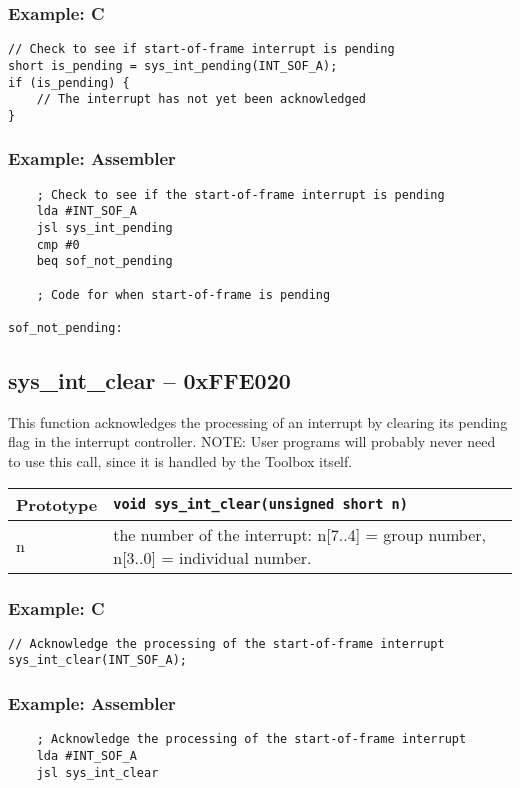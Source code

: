 \subsubsection*{Example: C}
\begin{lstlisting}
// Check to see if start-of-frame interrupt is pending
short is_pending = sys_int_pending(INT_SOF_A);
if (is_pending) {
	// The interrupt has not yet been acknowledged
}
\end{lstlisting}

\subsubsection*{Example: Assembler}
\begin{verbatim}
    ; Check to see if the start-of-frame interrupt is pending
    lda #INT_SOF_A
    jsl sys_int_pending
    cmp #0
    beq sof_not_pending

    ; Code for when start-of-frame is pending

sof_not_pending:
\end{verbatim}

\subsection*{sys\_int\_clear -- 0xFFE020}
This function acknowledges the processing of an interrupt by clearing its pending flag in the interrupt controller.
NOTE: User programs will probably never need to use this call, since it is handled by the Toolbox itself.

\bigskip

\begin{tabular}{|l||l|} \hline
Prototype & \lstinline!void sys_int_clear(unsigned short n)! \\ \hline
n & the number of the interrupt: n[7..4] = group number, n[3..0] = individual number. \\ \hline
\end{tabular}

\subsubsection*{Example: C}
\begin{lstlisting}
// Acknowledge the processing of the start-of-frame interrupt
sys_int_clear(INT_SOF_A);
\end{lstlisting}

\subsubsection*{Example: Assembler}
\begin{verbatim}
    ; Acknowledge the processing of the start-of-frame interrupt
    lda #INT_SOF_A
    jsl sys_int_clear
\end{verbatim}